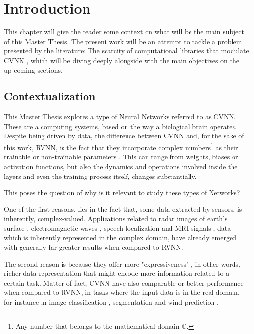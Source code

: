 
% 
\chapter{Introduction}
\label{chap:Chapter1}

This chapter will give the reader some context on what will be the main subject of this Master Thesis. The present work will be an attempt to tackle a problem presented by the literature: The scarcity of computational libraries that modulate \gls{CVNN} \parencite{bassey2021survey}, which will be diving deeply alongside with the main objectives on the up-coming sections.

\section{Contextualization}
\label{sec:chap1_context}

This Master Thesis explores a type of Neural Networks referred to as \gls{CVNN}. These are a computing systems, based on the way a biological brain operates. Despite being driven by data, the difference between CVNN and, for the sake of this work, \gls{RVNN}, is the fact that they incorporate complex numbers\footnote{Any number that belongs to the mathematical domain $\mathbb{C}$.} as their trainable or non-trainable parameters \parencite{clarke1990definition}. This can range from weights, biases or activation functions, but also the dynamics and operations involved inside the layers and even the training process itself, changes substantially.

This poses the question of why is it relevant to study these types of Networks? 

One of the first reasons, lies in the fact that, some data extracted by sensors, is inherently, complex-valued. Applications related to radar images of earth's surface \parencite{sunaga2019radar}, electromagnetic waves \parencite{mandic2009complex, hirose2012coherwave}, speech localization \parencite{tsuzuki2013approach} and MRI signals \parencite{virtue2017mribettercvnn}, data which is inherently represented in the complex domain, have already emerged with generally far greater results when compared to \gls{RVNN}. 

The second reason is because they offer more "expressiveness" \parencite{bassey2021survey, lee2022survey}, in other words, richer data representation that might encode more information related to a certain task. Matter of fact, \gls{CVNN} have also comparable or better performance when compared to \gls{RVNN}, in tasks where the input data is in the real domain, for instance in image classification \parencite{nafisah2018face}, segmentation \parencite{ceylan2013blood, saraswathi2014ensemble} and wind prediction \parencite{ccevik2018day}.

